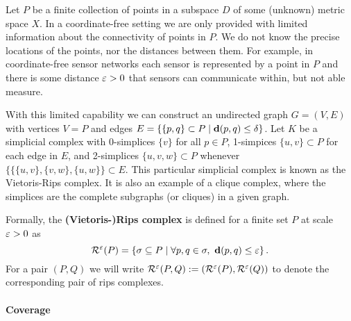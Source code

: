 Let $P$ be a finite collection of points in a subspace $D$ of some (unknown) metric space $X$.
In a coordinate-free setting we are only provided with limited information about the connectivity of points in $P$.
We do not know the precise locations of the points, nor the distances between them.
For example, in coordinate-free sensor networks each sensor is represented by a point in $P$ and there is some distance $\varepsilon > 0$ that sensors can communicate within, but not able measure.

With this limited capability we can construct an undirected graph $G=(V, E)$ with vertices $V=P$ and edges $E = \{\{p, q\}\subset P\mid \mathbf{d}(p,q)\leq\delta\}$.
Let $K$ be a simplicial complex with 0-simplices $\{v\}$ for all $p\in P$, 1-simpices $\{u, v\}\subset P$ for each edge in $E$, and 2-simplices $\{u,v,w\}\subset P$ whenever $\{\{\{u,v\},\{v,w\},\{u,w\}\}\subset E$.
This particular simplicial complex is known as the Vietoris-Rips complex.
It is also an example of a clique complex, where the simplices are the complete subgraphs (or cliques) in a given graph.

Formally, the \textbf{(Vietoris-)Rips complex} is defined for a finite set $P$ at scale $\varepsilon > 0$ as
\[ \mathcal{R}^\varepsilon(P) = \left\{\sigma \subseteq P\mid \forall p,q\in\sigma,\ \mathbf{d}(p, q)\leq \varepsilon\right\}. \]
For a pair $(P, Q)$ we will write $\mathcal{R}^\varepsilon(P,Q) := (\mathcal{R}^\varepsilon(P), \mathcal{R}^\varepsilon(Q))$ to denote the corresponding pair of rips complexes.

\paragraph{Coverage}


